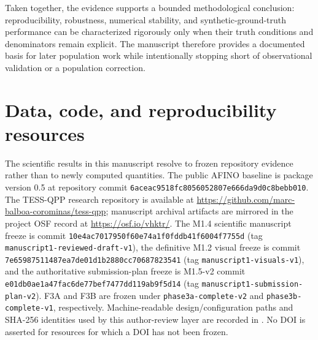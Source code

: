 \documentclass[11pt,a4paper]{article}
\begin{document}
Taken together, the evidence supports a bounded methodological conclusion: reproducibility, robustness, numerical stability, and synthetic-ground-truth performance can be characterized rigorously only when their truth conditions and denominators remain explicit. The manuscript therefore provides a documented basis for later population work while intentionally stopping short of observational validation or a population correction.

\section*{Data, code, and reproducibility resources}
\begin{sloppypar}
The scientific results in this manuscript resolve to frozen repository evidence rather than to newly computed quantities. The public AFINO baseline is package version 0.5 at repository commit \texttt{6aceac9518fc8056052807e666da9d0c8bebb010}. The TESS-QPP research repository is available at \url{https://github.com/marc-balboa-corominas/tess-qpp}; manuscript archival artifacts are mirrored in the project OSF record at \url{https://osf.io/vhktr/}. The M1.4 scientific manuscript freeze is commit \texttt{10e4ac7017950f60e74a1f0fddb41f6004f7755d} (tag \texttt{manuscript1-reviewed-draft-v1}), the definitive M1.2 visual freeze is commit \texttt{7e65987511487ea7de01d1b2880cc70687823541} (tag \texttt{manuscript1-visuals-v1}), and the authoritative submission-plan freeze is M1.5-v2 commit \texttt{e01db0ae1a47fac6de77bef7477dd119ab9f5d14} (tag \texttt{manuscript1-submission-plan-v2}). F3A and F3B are frozen under \texttt{phase3a-complete-v2} and \texttt{phase3b-complete-v1}, respectively. Machine-readable design/configuration paths and SHA-256 identities used by this author-review layer are recorded in . No DOI is asserted for resources for which a DOI has not been frozen.
\end{sloppypar}

\printbibliography
\end{document}
